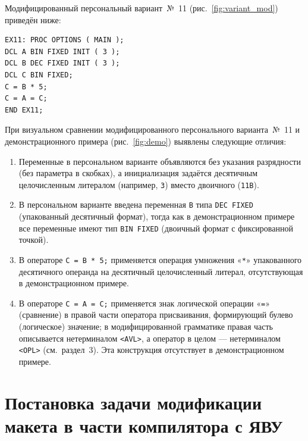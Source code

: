 \documentclass[a4paper,14pt]{extarticle}
\begin{document}
Модифицированный персональный вариант~№~11 (рис.~\ref{fig:variant_mod})
приведён ниже:

\begin{lstlisting}[style=PLIstyle]
EX11: PROC OPTIONS ( MAIN );
DCL A BIN FIXED INIT ( 3 );
DCL B DEC FIXED INIT ( 3 );
DCL C BIN FIXED;
C = B * 5;
C = A = C;
END EX11;
\end{lstlisting}

При визуальном сравнении модифицированного персонального варианта~№~11
и демонстрационного примера (рис.~\ref{fig:demo}) выявлены следующие отличия:

\begin{enumerate}
  \item Переменные в персональном варианте объявляются без указания
        разрядности (без параметра в скобках), а инициализация задаётся
        десятичным целочисленным литералом (например, \texttt{3}) вместо
        двоичного (\texttt{11B}).

  \item В персональном варианте введена переменная \texttt{B} типа
        \texttt{DEC FIXED} (упакованный десятичный формат), тогда как в
        демонстрационном примере все переменные имеют тип \texttt{BIN FIXED}
        (двоичный формат с фиксированной точкой).

  \item В операторе \texttt{C = B * 5;} применяется операция умножения «\texttt{*}»
        упакованного десятичного операнда на десятичный целочисленный литерал,
        отсутствующая в демонстрационном примере.

  \item В операторе \texttt{C = A = C;} применяется знак логической операции
        «\texttt{=}» (сравнение) в правой части оператора присваивания,
        формирующий булево (логическое) значение; в модифицированной грамматике
        правая часть описывается нетерминалом \texttt{<AVL>}, а оператор в целом
        — нетерминалом \texttt{<OPL>} (см.\ раздел~3). Эта конструкция отсутствует
        в демонстрационном примере.
\end{enumerate}

\section{Постановка задачи модификации макета в части компилятора с ЯВУ}
\end{document}
